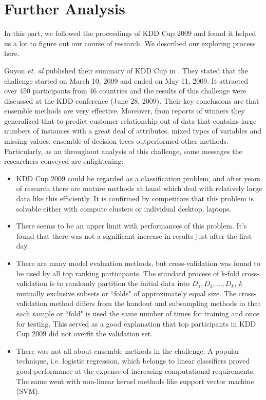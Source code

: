 \documentclass[journal]{IEEEtran}
\begin{document}
\section{Further Analysis}\label{Sec:More Related Work}
In this part, we followed the proceedings of KDD Cup 2009 and found it helped us a lot to figure out our course of research. We described our exploring process here.
\par
Guyon \emph{et. al} published their summary of KDD Cup in \cite{Ref:AnalysisOfTheKDDCup2009}. They stated that the challenge started on March 10, 2009 and ended on May 11, 2009. It attracted over 450 participants from 46 countries and the results of this challenge were discussed at the KDD conference (June 28, 2009). Their key conclusions are that ensemble methods are very effective. Moreover, from reports of winners they generalized that to predict customer relationship out of data that contains large numbers of instances with a great deal of attributes, mixed types of variables and missing values, ensemble of decision trees outperformed other methods. Particularly, as an throughout analysis of this challenge, some messages the researchers conveyed are enlightening:
\begin{itemize}
  \item KDD Cup 2009 could be regarded as a classification problem, and after years of research there are mature methods at hand which deal with relatively large data like this efficiently. It is confirmed by competitors that this problem is solvable either with compute clusters or individual desktop, laptops.
  \item There seems to be an upper limit with performances of this problem. It's found that there was not a significant increase in results just after the first day.
  \item There are many model evaluation methods, but cross-validation was found to be used by all top ranking participants. The standard process of k-fold cross-validation is to randomly partition the initial data into $D_{1},D_{2},\ldots,D_{k}$, $k$ mutually exclusive subsets or ``folds" of approximately equal size. The cross-validation method differs from the handout and subsampling methods in that each sample or ``fold" is used the same number of times for training and once for testing. This served as a good explanation that top participants in KDD Cup 2009 did not overfit the validation set.
  \item There was not all about ensemble methods in the challenge. A popular technique, i.e. logistic regression, which belongs to linear classifiers proved good performance at the expense of increasing computational requirements. The same went with non-linear kernel methods like support vector machine (SVM).
\end{itemize}
\end{document}
